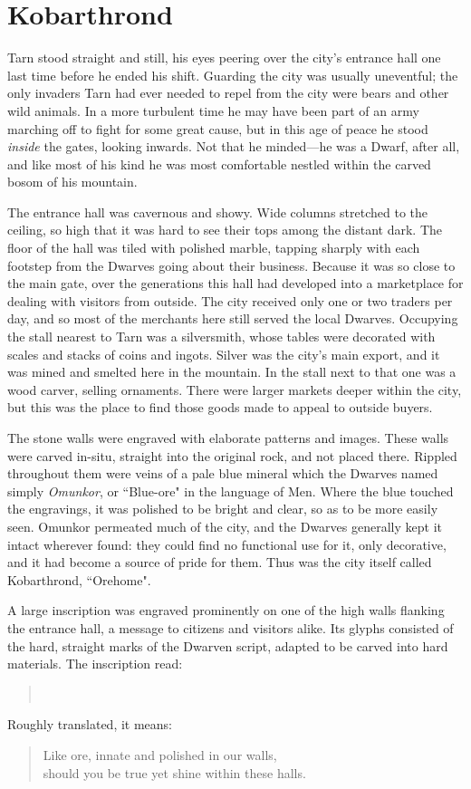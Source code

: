 \chapter{Kobarthrond}
Tarn stood straight and still, his eyes peering over the city's entrance hall one last time before he ended his shift.  Guarding the city was usually uneventful; the only invaders Tarn had ever needed to repel from the city were bears and other wild animals.  In a more turbulent time he may have been part of an army marching off to fight for some great cause, but in this age of peace he stood \emph{inside} the gates, looking inwards.  Not that he minded---he was a Dwarf, after all, and like most of his kind he was most comfortable nestled within the carved bosom of his mountain.

The entrance hall was cavernous and showy.  Wide columns stretched to the ceiling, so high that it was hard to see their tops among the distant dark.  The floor of the hall was tiled with polished marble, tapping sharply with each footstep from the Dwarves going about their business.  Because it was so close to the main gate, over the generations this hall had developed into a marketplace for dealing with visitors from outside.  The city received only one or two traders per day, and so most of the merchants here still served the local Dwarves.  Occupying the stall nearest to Tarn was a silversmith, whose tables were decorated with scales and stacks of coins and ingots.  Silver was the city's main export, and it was mined and smelted here in the mountain.  In the stall next to that one was a wood carver, selling ornaments.  There were larger markets deeper within the city, but this was the place to find those goods made to appeal to outside buyers.

The stone walls were engraved with elaborate patterns and images.  These walls were carved in-situ, straight into the original rock, and not placed there.  Rippled throughout them were veins of a pale blue mineral which the Dwarves named simply \emph{Omunkor}, or ``Blue-ore" in the language of Men.  Where the blue touched the engravings, it was polished to be bright and clear, so as to be more easily seen.  Omunkor permeated much of the city, and the Dwarves generally kept it intact wherever found: they could find no functional use for it, only decorative, and it had become a source of pride for them.  Thus was the city itself called Kobarthrond, ``Orehome".

A large inscription was engraved prominently on one of the high walls flanking the entrance hall, a message to citizens and visitors alike.  Its glyphs consisted of the hard, straight marks of the Dwarven script, adapted to be carved into hard materials.  The inscription read:
\begin{verse}
\\
\end{verse}
Roughly translated, it means:
\begin{verse}
Like ore, innate and polished in our walls,\\
should you be true yet shine within these halls.
\end{verse}

